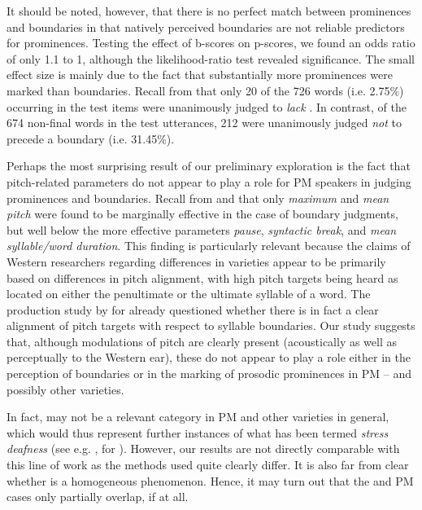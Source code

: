 \documentclass[output=paper
,modfonts
,nonflat]{langsci/langscibook}
\begin{document}
It should be noted, however, that there is no perfect match between prominences and boundaries in that natively perceived boundaries are not reliable predictors for prominences. Testing the effect of b-scores on p-scores, we found an odds ratio of only 1.1 to 1, although the likelihood-ratio test revealed significance. The small effect size is mainly due to the fact that substantially more prominences were marked than boundaries. Recall from  that only 20 of the 726 words (i.e. 2.75\%) occurring in the test items were unanimously judged to \textit{lack} . In contrast, of the 674 non-final words in the test utterances, 212 were unanimously judged \textit{not} to precede a boundary (i.e. 31.45\%).

Perhaps the most surprising result of our preliminary exploration is the fact that pitch-related parameters do not appear to play a role for PM speakers in judging prominences and boundaries. Recall from  and  that only \textit{maximum} and \textit{mean pitch} were found to be marginally effective in the case of boundary judgments, but well below the more effective parameters \textit{pause}, \textit{syntactic break}, and \textit{mean syllable/word duration}. This finding is particularly relevant because the claims of Western researchers regarding  differences in  varieties appear to be primarily based on differences in pitch alignment, with high pitch targets being heard as located on either the penultimate or the ultimate syllable of a word. The production study by \citet{Maskikit-Essed2016} for   already questioned whether there is in fact a clear alignment of pitch targets with respect to syllable boundaries. Our study suggests that, although modulations of pitch are clearly present (acoustically as well as perceptually to the Western ear), these do not appear to play a role either in the perception of boundaries or in the marking of prosodic prominences in PM – and possibly other  varieties. 

In fact,  may not be a relevant category in PM and other  varieties in general, which would thus represent further instances of what has been termed \textit{stress deafness} (see e.g. \citealt{Peperkamp2002}, \citealt{Dupoux2010} for ). However, our results are not directly comparable with this line of work as the methods used quite clearly differ. It is also far from clear whether  is a homogeneous phenomenon. Hence, it may turn out that the  and PM cases only partially overlap, if at all.
\end{document}
